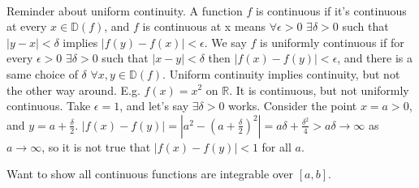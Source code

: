 \documentclass[10pt,letter]{article}
\begin{document}
\paragraph{}
Reminder about uniform continuity. A function $f$ is continuous if it's continuous at every $x\in \mathbb{D}(f)$, and $f$ is continuous at x means $\forall\epsilon>0$ $\exists\delta>0$ such that $|y-x|<\delta$ implies $|f(y)-f(x)|<\epsilon$. We say $f$ is uniformly continuous if for every $\epsilon>0$ $\exists\delta>0$ such that $|x-y|<\delta$ then $|f(x)-f(y)|<\epsilon$, and there is a same choice of $\delta$ $\forall x,y\in\mathbb{D}(f)$. Uniform continuity implies continuity, but not the other way around. E.g. $f(x)=x^2$ on $\mathbb{R}$. It is continuous, but not uniformly continuous. Take $\epsilon=1$, and let's say $\exists\delta>0$ works. Consider the point $x=a>0$, and $y=a+\frac{\delta}{2}$. $|f(x)-f(y)|=|a^2-(a+\frac{\delta}{2})^2|=a\delta+\frac{\delta^2}{4}>a\delta\rightarrow\infty$ as $a\rightarrow\infty$, so it is not true that $|f(x)-f(y)|<1$ for all $a$. 

Want to show all continuous functions are integrable over $[a,b]$.  
\end{document}
